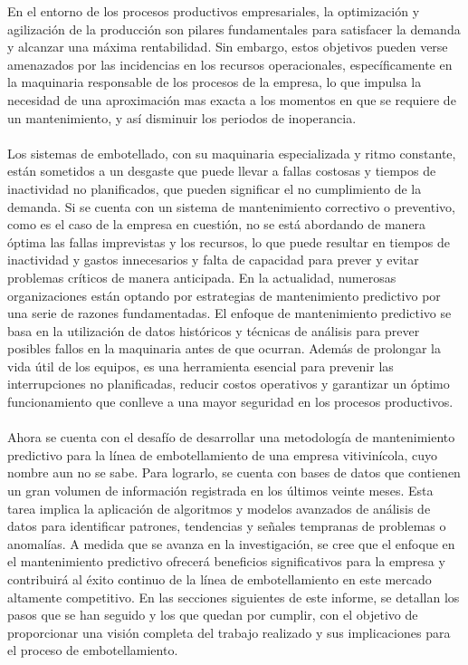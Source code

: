\documentclass[10pt]{article}
\begin{document}
En el entorno de los procesos productivos empresariales, la optimización y agilización de la producción son pilares fundamentales para satisfacer la demanda y alcanzar una máxima rentabilidad. Sin embargo, estos objetivos pueden verse amenazados por las incidencias en los recursos operacionales, específicamente en la maquinaria responsable de los procesos de la empresa, lo que impulsa la necesidad de una aproximación mas exacta a los momentos en que se requiere de un mantenimiento, y así disminuir los periodos de inoperancia. \\
\\
Los sistemas de embotellado, con su maquinaria especializada y ritmo constante, están sometidos a un desgaste que puede llevar a fallas costosas y tiempos de inactividad no planificados, que pueden significar el no cumplimiento de la demanda. Si se cuenta con un sistema de mantenimiento correctivo o preventivo, como es el caso de la empresa en cuestión, no se está abordando de manera óptima las fallas imprevistas y los recursos, lo que puede resultar en tiempos de inactividad y gastos innecesarios y falta de capacidad para prever y evitar problemas críticos de manera anticipada. En la actualidad, numerosas organizaciones están optando por estrategias de mantenimiento predictivo por una serie de razones fundamentadas. El enfoque de mantenimiento predictivo se basa en la utilización de datos históricos y técnicas de análisis para prever posibles fallos en la maquinaria antes de que ocurran. Además de prolongar la vida útil de los equipos, es una herramienta esencial para prevenir las interrupciones no planificadas, reducir costos operativos y garantizar un óptimo funcionamiento que conlleve a una mayor seguridad en los procesos productivos. \\
\\
Ahora se cuenta con el desafío de desarrollar una metodología de mantenimiento predictivo para la línea de embotellamiento de una empresa vitivinícola, cuyo nombre aun no se sabe. Para lograrlo, se cuenta con bases de datos que contienen un gran volumen de información registrada en los últimos veinte meses. Esta tarea implica la aplicación de algoritmos y modelos avanzados de análisis de datos para identificar patrones, tendencias y señales tempranas de problemas o anomalías. A medida que se avanza en la investigación, se cree que el enfoque en el mantenimiento predictivo ofrecerá beneficios significativos para la empresa y contribuirá al éxito continuo de la línea de embotellamiento en este mercado altamente competitivo. En las secciones siguientes de este informe, se detallan los pasos que se han seguido y los que quedan por cumplir, con el objetivo de proporcionar una visión completa del trabajo realizado y sus implicaciones para el proceso de embotellamiento.
\end{document}
